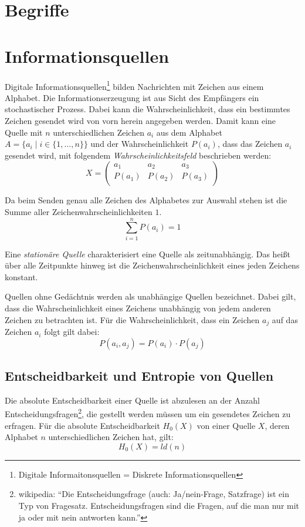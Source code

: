\section{Begriffe}

\section{Informationsquellen}
Digitale Informationsquellen\footnote{Digitale Informaitonsquellen = Diskrete Informationsquellen} bilden Nachrichten mit Zeichen aus einem Alphabet. Die Informationserzeugung ist aus Sicht des Empfängers ein stochastischer Prozess. Dabei kann die Wahrscheinlichkeit, dass ein bestimmtes Zeichen gesendet wird von vorn herein angegeben werden. Damit kann eine Quelle mit $n$ unterschiedlichen Zeichen $a_i$ aus dem Alphabet $A = \{a_i \mid i \in \{1, \ldots, n\}\}$ und der Wahrscheinlichkeit $P(a_i)$, dass das Zeichen $a_i$ gesendet wird, mit folgendem \textit{Wahrscheinlichkeitsfeld} beschrieben werden:
$$
	X =
	\left(
		\begin{array}{*{4}{c}}
		  a_1    &  a_2   &  a_3   \\
		  P(a_1) & P(a_2) & P(a_3) \\
		\end{array}
	\right)
$$

Da beim Senden genau alle Zeichen des Alphabetes zur Auswahl stehen ist die Summe aller Zeichenwahrscheinlichkeiten $1$.
$$
	\sum_{i=1}^n P(a_i) = 1
$$

Eine \textit{stationäre Quelle} charakterisiert eine Quelle als zeitunabhängig. Das heißt über alle Zeitpunkte hinweg ist die Zeichenwahrscheinlichkeit eines jeden Zeichens konstant.

Quellen ohne Gedächtnis werden als unabhängige Quellen bezeichnet. Dabei gilt, dass die Wahrscheinlichkeit eines Zeichens unabhängig von jedem anderen Zeichen zu betrachten ist. Für die Wahrscheinlichkeit, dass ein Zeichen $a_j$ auf das Zeichen $a_i$ folgt gilt dabei:
$$ P(a_i, a_j) = P(a_i) \cdot P(a_j) $$

\subsection{Entscheidbarkeit und Entropie von Quellen}
Die absolute Entscheidbarkeit einer Quelle ist abzulesen an der Anzahl Entscheidungsfragen\footnote{wikipedia: "`Die Entscheidungsfrage (auch: Ja/nein-Frage, Satzfrage) ist ein Typ von Fragesatz. Entscheidungsfragen sind die Fragen, auf die man nur mit ja oder mit nein antworten kann."'}, die gestellt werden müssen um ein gesendetes Zeichen zu erfragen. Für die absolute Entscheidbarkeit $H_0(X)$ von einer Quelle $X$, deren Alphabet $n$ unterschiedlichen Zeichen hat, gilt:
$$ H_0(X) = ld(n) $$

